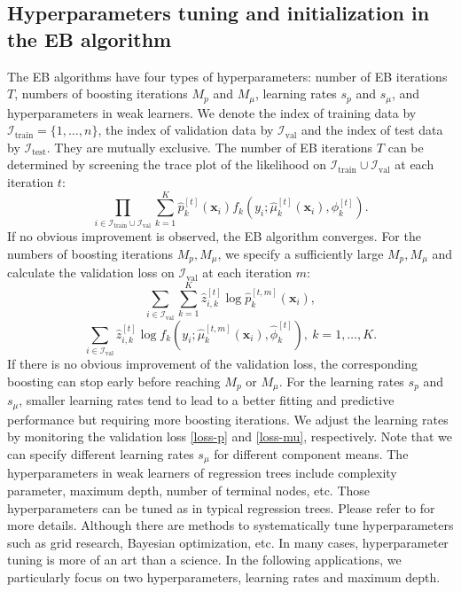 \documentclass[11pt]{article}
\numberwithin{equation}{section}
\def\bx{\boldsymbol{x}}
\begin{document}
\subsection{Hyperparameters tuning and initialization in the EB algorithm}
The EB algorithms have four types of hyperparameters: number of EB iterations $T$, numbers of boosting iterations $M_p$ and $M_\mu$, learning rates $s_p$ and $s_\mu$, and hyperparameters in weak learners. 
We denote the index of training data by $\mathcal{I}_\text{train}=\{1,\ldots,n\}$, the index of validation data by $\mathcal{I}_\text{val}$ and the index of test data by $\mathcal{I}_\text{test}$. They are mutually exclusive.
The number of EB iterations $T$ can be determined by screening the trace plot of the likelihood on $\mathcal{I}_\text{train}\cup\mathcal{I}_\text{val}$ at each iteration $t$:
$$\prod_{i\in\mathcal{I}_\text{train}\cup\mathcal{I}_\text{val}}\sum_{k=1}^K\hat{p}_k^{[t]}(\bx_i)f_k(y_i;\hat{\mu}_k^{[t]}(\bx_i),\phi_k^{[t]}).$$
If no obvious improvement is observed, the EB algorithm converges.
For the numbers of boosting iterations  {$M_p,M_\mu$}, we specify a sufficiently large $M_p,M_\mu$ and calculate the validation loss on $\mathcal{I}_\text{val}$ at each iteration $m$:
\begin{equation}\label{loss-p}
\sum_{i\in\mathcal{I}_\text{val}}\sum_{k=1}^K \hat{z}_{i,k}^{[t]}\log \hat{p}_k^{[t,m]}(\bx_i),
\end{equation}
\begin{equation}\label{loss-mu}
\sum_{i\in\mathcal{I}_\text{val}} \hat{z}^{[t]}_{i,k}\log f_k\left(y_i;\hat{\mu}_k^{[t,m]}\left(\bx_i\right),\hat{\phi}_k^{[t]}\right), ~ k=1,\ldots,K.
\end{equation}
If there is no obvious improvement of the validation loss, the corresponding boosting can stop early before reaching $M_p$ or $M_\mu$.  
For the learning rates {$s_p$} and $s_\mu$, smaller learning rates tend to lead to a better fitting and predictive performance but requiring more boosting iterations.
We adjust the learning rates by monitoring the validation loss \eqref{loss-p} and \eqref{loss-mu}, respectively.
Note that we can specify different learning rates $s_\mu$ for different component means.
The hyperparameters in weak learners of regression trees include complexity parameter, maximum depth, number of terminal nodes, etc.
Those hyperparameters can be tuned as in typical regression trees. Please refer to \citet{hastie2009elements} for more details.
Although there are methods to systematically tune  hyperparameters such as grid research, Bayesian optimization, etc.
In many cases, hyperparameter tuning is more of an art than a science.
In the following applications, we particularly focus on two hyperparameters, learning rates and maximum depth. 
\end{document}
